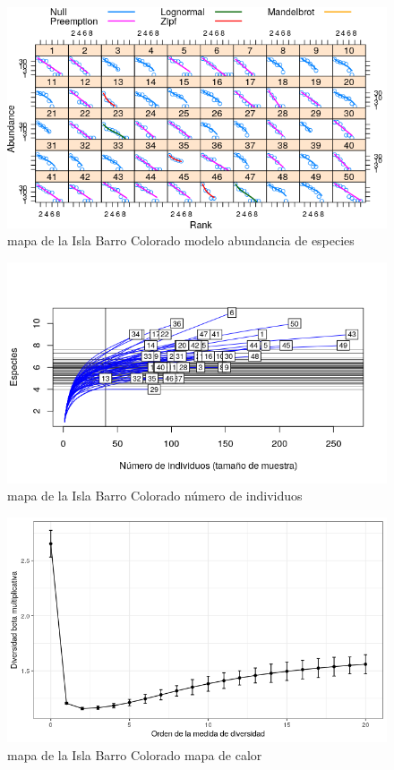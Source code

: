 \documentclass[11pt,]{article}
\begin{document}
\begin{figure}
\centering
\includegraphics[width=1.00000\textwidth]{modelo_abundancia_especie.png}
\caption{mapa de la Isla Barro Colorado modelo abundancia de especies
\label{fig:bci_map}}
\end{figure}

\begin{figure}
\centering
\includegraphics[width=1.00000\textwidth]{Numero_individuos.png}
\caption{mapa de la Isla Barro Colorado número de individuos
\label{fig:bci_map}}
\end{figure}

\begin{figure}
\centering
\includegraphics[width=1.00000\textwidth]{diversidad_beta.png}
\caption{mapa de la Isla Barro Colorado mapa de calor
\label{fig:bci_map}}
\end{figure}
\end{document}
